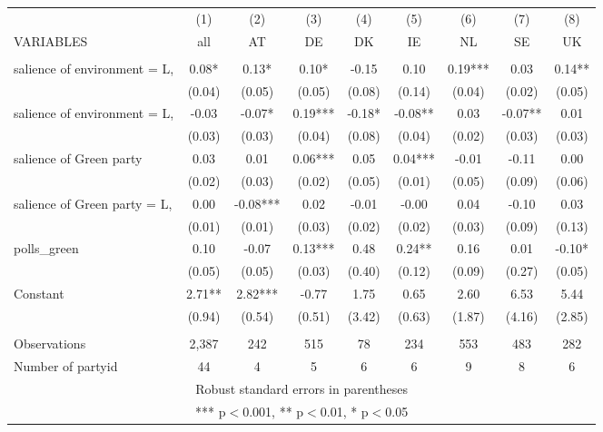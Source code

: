 \documentclass[]{article}
\begin{document}
\begin{tabular}{lcccccccc} \hline
 & (1) & (2) & (3) & (4) & (5) & (6) & (7) & (8) \\
VARIABLES & all & AT & DE & DK & IE & NL & SE & UK \\ \hline
 &  &  &  &  &  &  &  &  \\
salience of environment = L, & 0.08* & 0.13* & 0.10* & -0.15 & 0.10 & 0.19*** & 0.03 & 0.14** \\
 & (0.04) & (0.05) & (0.05) & (0.08) & (0.14) & (0.04) & (0.02) & (0.05) \\
salience of environment = L, & -0.03 & -0.07* & 0.19*** & -0.18* & -0.08** & 0.03 & -0.07** & 0.01 \\
 & (0.03) & (0.03) & (0.04) & (0.08) & (0.04) & (0.02) & (0.03) & (0.03) \\
salience of Green party & 0.03 & 0.01 & 0.06*** & 0.05 & 0.04*** & -0.01 & -0.11 & 0.00 \\
 & (0.02) & (0.03) & (0.02) & (0.05) & (0.01) & (0.05) & (0.09) & (0.06) \\
salience of Green party = L, & 0.00 & -0.08*** & 0.02 & -0.01 & -0.00 & 0.04 & -0.10 & 0.03 \\
 & (0.01) & (0.01) & (0.03) & (0.02) & (0.02) & (0.03) & (0.09) & (0.13) \\
polls\_green & 0.10 & -0.07 & 0.13*** & 0.48 & 0.24** & 0.16 & 0.01 & -0.10* \\
 & (0.05) & (0.05) & (0.03) & (0.40) & (0.12) & (0.09) & (0.27) & (0.05) \\
Constant & 2.71** & 2.82*** & -0.77 & 1.75 & 0.65 & 2.60 & 6.53 & 5.44 \\
 & (0.94) & (0.54) & (0.51) & (3.42) & (0.63) & (1.87) & (4.16) & (2.85) \\
 &  &  &  &  &  &  &  &  \\
Observations & 2,387 & 242 & 515 & 78 & 234 & 553 & 483 & 282 \\
 Number of partyid & 44 & 4 & 5 & 6 & 6 & 9 & 8 & 6 \\ \hline
\multicolumn{9}{c}{ Robust standard errors in parentheses} \\
\multicolumn{9}{c}{ *** p$<$0.001, ** p$<$0.01, * p$<$0.05} \\
\end{tabular}
\end{document}
